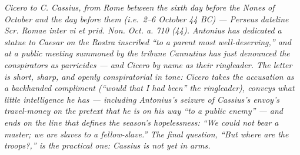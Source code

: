 
\textit{Cicero to C. Cassius, from Rome between the sixth day before the Nones of October and the day before them (i.e.\ 2--6 October 44 BC) ---
Perseus dateline \textit{Scr. Romae inter vi et prid. Non. Oct. a. 710 (44)}.
Antonius has dedicated a statue to Caesar on the Rostra inscribed ``to a parent most well-deserving,'' and at a public meeting summoned by the tribune Cannutius has just denounced the conspirators as parricides --- and Cicero by name as their ringleader. The letter is short, sharp, and openly conspiratorial in tone: Cicero takes the accusation as a backhanded compliment (``would that I had been'' the ringleader), conveys what little intelligence he has --- including Antonius's seizure of Cassius's envoy's travel-money on the pretext that he is on his way ``to a public enemy'' --- and ends on the line that defines the season's hopelessness: ``We could not bear a master; we are slaves to a fellow-slave.'' The final question, ``But where are the troops?,'' is the practical one: Cassius is not yet in arms.}
